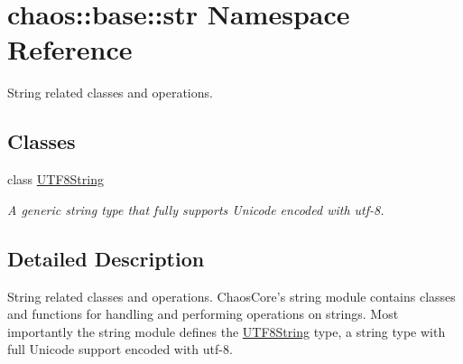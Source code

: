 \hypertarget{namespacechaos_1_1base_1_1str}{\section{chaos\-:\-:base\-:\-:str Namespace Reference}
\label{namespacechaos_1_1base_1_1str}
}


String related classes and operations.  


\subsection*{Classes}
\begin{DoxyCompactItemize}
\item 
class \hyperlink{classchaos_1_1base_1_1str_1_1_u_t_f8_string}{U\-T\-F8\-String}
\begin{DoxyCompactList}\small\item\em A generic string type that fully supports Unicode encoded with utf-\/8. \end{DoxyCompactList}\end{DoxyCompactItemize}


\subsection{Detailed Description}
String related classes and operations. Chaos\-Core's string module contains classes and functions for handling and performing operations on strings. Most importantly the string module defines the \hyperlink{classchaos_1_1base_1_1str_1_1_u_t_f8_string}{U\-T\-F8\-String} type, a string type with full Unicode support encoded with utf-\/8. 